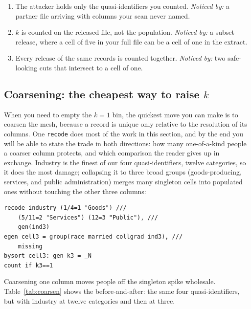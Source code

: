 \begin{restson}
\begin{enumerate}
\item The attacker holds only the quasi-identifiers you counted. \emph{Noticed by:} a partner file arriving with columns your scan never named.
\item $k$ is counted on the released file, not the population. \emph{Noticed by:} a subset release, where a cell of five in your full file can be a cell of one in the extract.
\item Every release of the same records is counted together. \emph{Noticed by:} two safe-looking cuts that intersect to a cell of one.
\end{enumerate}
\end{restson}

\subsection{Coarsening: the cheapest way to raise \texorpdfstring{$k$}{k}}\label{sec:coarsen}
When you need to empty the $k=1$ bin, the quickest move you can make is to coarsen the mesh, because a record is unique only relative to the resolution of its columns. One \texttt{recode} does most of the work in this section, and by the end you will be able to state the trade in both directions: how many one-of-a-kind people a coarser column protects, and which comparison the reader gives up in exchange. Industry is the finest of our four quasi-identifiers, twelve categories, so it does the most damage; collapsing it to three broad groups (goods-producing, services, and public administration) merges many singleton cells into populated ones without touching the other three columns:
\par
{\footnotesize
\begin{verbatim}
recode industry (1/4=1 "Goods") ///
    (5/11=2 "Services") (12=3 "Public"), ///
    gen(ind3)
egen cell3 = group(race married collgrad ind3), ///
    missing
bysort cell3: gen k3 = _N
count if k3==1
\end{verbatim}
}
Coarsening one column moves people off the singleton spike wholesale. Table~\ref{tab:coarsen} shows the before-and-after: the same four quasi-identifiers, but with industry at twelve categories and then at three.

